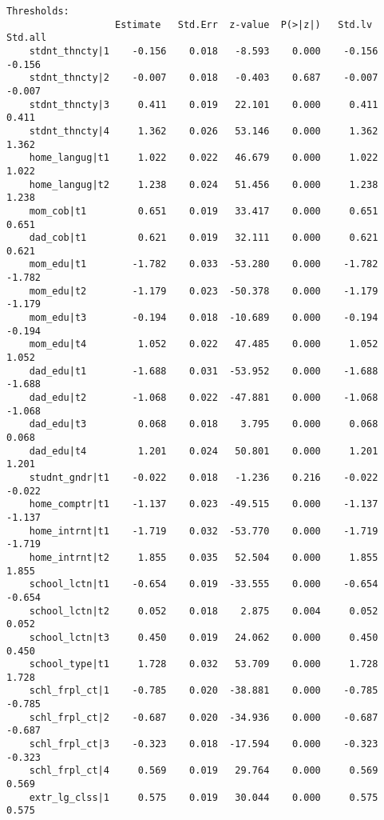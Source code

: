 \documentclass[
]{article}
\begin{document}
\begin{verbatim}
Thresholds:
                   Estimate   Std.Err  z-value  P(>|z|)   Std.lv   Std.all
    stdnt_thncty|1    -0.156    0.018   -8.593    0.000    -0.156   -0.156
    stdnt_thncty|2    -0.007    0.018   -0.403    0.687    -0.007   -0.007
    stdnt_thncty|3     0.411    0.019   22.101    0.000     0.411    0.411
    stdnt_thncty|4     1.362    0.026   53.146    0.000     1.362    1.362
    home_langug|t1     1.022    0.022   46.679    0.000     1.022    1.022
    home_langug|t2     1.238    0.024   51.456    0.000     1.238    1.238
    mom_cob|t1         0.651    0.019   33.417    0.000     0.651    0.651
    dad_cob|t1         0.621    0.019   32.111    0.000     0.621    0.621
    mom_edu|t1        -1.782    0.033  -53.280    0.000    -1.782   -1.782
    mom_edu|t2        -1.179    0.023  -50.378    0.000    -1.179   -1.179
    mom_edu|t3        -0.194    0.018  -10.689    0.000    -0.194   -0.194
    mom_edu|t4         1.052    0.022   47.485    0.000     1.052    1.052
    dad_edu|t1        -1.688    0.031  -53.952    0.000    -1.688   -1.688
    dad_edu|t2        -1.068    0.022  -47.881    0.000    -1.068   -1.068
    dad_edu|t3         0.068    0.018    3.795    0.000     0.068    0.068
    dad_edu|t4         1.201    0.024   50.801    0.000     1.201    1.201
    studnt_gndr|t1    -0.022    0.018   -1.236    0.216    -0.022   -0.022
    home_comptr|t1    -1.137    0.023  -49.515    0.000    -1.137   -1.137
    home_intrnt|t1    -1.719    0.032  -53.770    0.000    -1.719   -1.719
    home_intrnt|t2     1.855    0.035   52.504    0.000     1.855    1.855
    school_lctn|t1    -0.654    0.019  -33.555    0.000    -0.654   -0.654
    school_lctn|t2     0.052    0.018    2.875    0.004     0.052    0.052
    school_lctn|t3     0.450    0.019   24.062    0.000     0.450    0.450
    school_type|t1     1.728    0.032   53.709    0.000     1.728    1.728
    schl_frpl_ct|1    -0.785    0.020  -38.881    0.000    -0.785   -0.785
    schl_frpl_ct|2    -0.687    0.020  -34.936    0.000    -0.687   -0.687
    schl_frpl_ct|3    -0.323    0.018  -17.594    0.000    -0.323   -0.323
    schl_frpl_ct|4     0.569    0.019   29.764    0.000     0.569    0.569
    extr_lg_clss|1     0.575    0.019   30.044    0.000     0.575    0.575


\end{verbatim}
\end{document}
